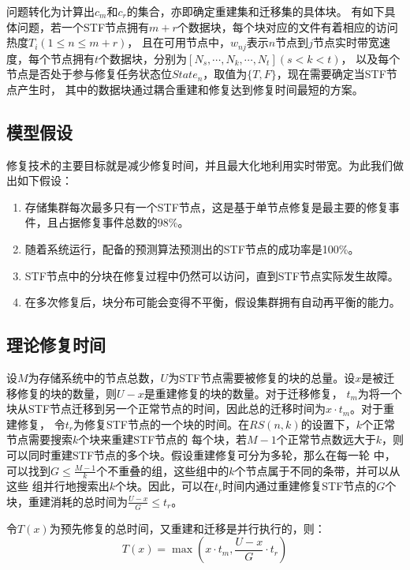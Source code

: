 问题转化为计算出$c_m$和$c_r$的集合，亦即确定重建集和迁移集的具体块。
有如下具体问题，若一个STF节点拥有$m+r$个数据块，每个块对应的文件有着相应的访问热度$T_i(1\leqslant n \leqslant m+r)$，
且在可用节点中，$w_{nj}$表示$n$节点到$j$节点实时带宽速度，每个节点拥有$t$个数据块，分别为$[N_s,\cdots,N_k,\cdots,N_t](s<k<t)$，
以及每个节点是否处于参与修复任务状态位$State_n$，取值为$\{T,F\}$，现在需要确定当STF节点产生时，
其中的数据块通过耦合重建和修复达到修复时间最短的方案。

\subsection{模型假设}
修复技术的主要目标就是减少修复时间，并且最大化地利用实时带宽。为此我们做出如下假设：

\begin{enumerate}
	\item 存储集群每次最多只有一个STF节点，这是基于单节点修复是最主要的修复事件，且占据修复事件总数的98\%\cite{rashmi2013solution}。
	\item 随着系统运行，配备的预测算法预测出的STF节点的成功率是100\%。
	\item STF节点中的分块在修复过程中仍然可以访问，直到STF节点实际发生故障。
	\item 在多次修复后，块分布可能会变得不平衡，假设集群拥有自动再平衡的能力。
\end{enumerate}

\subsection{理论修复时间}
\label{subsection3.1}

设$M$为存储系统中的节点总数，$U$为STF节点需要被修复的块的总量。设$x$是被迁移修复的块的数量，则$U-x$是重建修复的块的数量。对于迁移修复，
$t_m$为将一个块从STF节点迁移到另一个正常节点的时间，因此总的迁移时间为$x \cdot t_m $。对于重建修复，
令$t_r$为修复STF节点的一个块的时间。在$RS(n,k)$的设置下，$k$个正常节点需要搜索$k$个块来重建STF节点的
每个块，若$M-1$个正常节点数远大于$k$，则可以同时重建STF节点的多个块。假设重建修复可分为多轮，那么在每一轮
中，可以找到$G\leqslant \frac{M-1}{k}$个不重叠的组，这些组中的$k$个节点属于不同的条带，并可以从这些
组并行地搜索出$k$个块。因此，可以在$t_r$时间内通过重建修复STF节点的$G$个块，重建消耗的总时间为$\frac{U-x}{G} \leqslant t_r$。

令$T(x)$为预先修复的总时间，又重建和迁移是并行执行的，则：
\begin{equation}
	\label{eq:3-1}
	T(x)=\max \left(x \cdot t_{m}, \frac{U-x}{G} \cdot t_{r}\right)
\end{equation}

